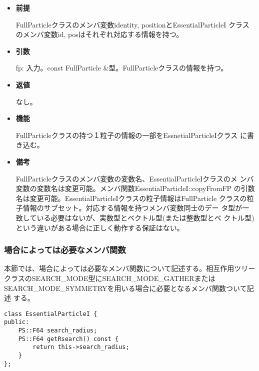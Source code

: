 \begin{itemize}

\item {\bf 前提}

  FullParticleクラスのメンバ変数identity, positionとEssentialParticleI
  クラスのメンバ変数id, posはそれぞれ対応する情報を持つ。

\item {\bf 引数}

  fp: 入力。const FullParticle \&型。FullParticleクラスの情報を持つ。
  
\item {\bf 返値}

  なし。
  
\item {\bf 機能}

  FullParticleクラスの持つ１粒子の情報の一部をEssnetialParticleIクラス
  に書き込む。
  
\item {\bf 備考}

  FullParticleクラスのメンバ変数の変数名、EssentialParticleIクラスのメ
  ンバ変数の変数名は変更可能。メンバ関数EssentialParticleI::copyFromFP
  の引数名は変更可能。EssentialParticleIクラスの粒子情報はFullParticle
  クラスの粒子情報のサブセット。対応する情報を持つメンバ変数同士のデー
  タ型が一致している必要はないが、実数型とベクトル型(または整数型とベ
  クトル型)という違いがある場合に正しく動作する保証はない。

\end{itemize}

\subsubsection{場合によっては必要なメンバ関数}


本節では、場合によっては必要なメンバ関数について記述する。相互作用ツリー
クラスのSEARCH\_MODE型にSEARCH\_MODE\_GATHERまたは
SEARCH\_MODE\_SYMMETRYを用いる場合に必要となるメンバ関数ついて記述
する。



\begin{screen}
\begin{verbatim}
class EssentialParticleI {
public:
    PS::F64 search_radius;
    PS::F64 getRsearch() const {
        return this->search_radius;
    }
};
\end{verbatim}
\end{screen}

